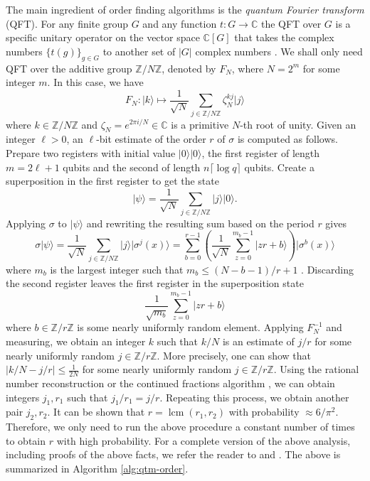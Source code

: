 \documentclass[11pt]{article}
\theoremstyle{plain}
\theoremstyle{definition}
\newcommand{\ldbrac}[1]{\lvert#1\rangle}
\newcommand{\abs}[1]{\left\vert#1\right\vert}
\DeclareMathOperator{\lcm}{lcm} %
\def\C{\ensuremath{\mathbb{C}}}
\def\Z{\ensuremath{\mathbb{Z}}}
\begin{document}
The main ingredient of order finding algorithms is the \textit{quantum Fourier transform} (QFT). 
For any finite group $G$ and any function $t: G \rightarrow \C$ the QFT over $G$ is a specific 
unitary operator on the vector space $\C[G]$ that takes the complex numbers $\{ t(g) \}_{g \in 
G}$ to another set of $\abs{G}$ complex numbers \cite{hallgren2003hidden}. We shall only need QFT 
over the additive group $\Z/N\Z$, denoted by $F_N$, where $N = 2^m$ for some integer $m$. In this 
case, we have 
\[ F_N: \ldbrac{k} \longmapsto \frac{1}{\sqrt{N}}\sum_{j \in \Z/N\Z}\zeta_N^{kj}\ldbrac{j} \]
where $k \in \Z/N\Z$ and $\zeta_N = e^{2\pi i / N} \in \C$ is a primitive $N$-th root of unity. 
Given an integer $\ell > 0$, an $\ell$-bit estimate of the order $r$ of $\sigma$ is computed as 
follows. Prepare two registers with initial value $\ldbrac{0}\ldbrac{0}$, the first register of 
length $m = 2\ell + 1$ qubits and the second of length $n\lceil \log q \rceil$ qubits. Create a 
superposition in the first register to get the state 
\[ \ldbrac{\psi} = \frac{1}{\sqrt{N}} \sum_{j \in \Z/N\Z} \ldbrac{j}\ldbrac{0}. \]
Applying $\sigma$ to $\ldbrac{\psi}$ and rewriting the resulting sum based on the period $r$ gives
\[ \sigma\ldbrac{\psi} = \frac{1}{\sqrt{N}} \sum_{j \in \Z/N\Z} \ldbrac{j}\ldbrac{\sigma^j(x)} = 
\sum_{b = 0}^{r - 1}\left( \frac{1}{\sqrt{N}}\sum_{z = 0}^{m_b - 1}\ldbrac{zr + b} \right) 
\ldbrac{\sigma^b(x)} \]
where $m_b$ is the largest integer such that $m_b \le (N - b - 1) / r + 1$ 
\cite{kaye2007introduction}. Discarding the second register leaves the first register in the 
superposition state
\[ \frac{1}{\sqrt{m_b}} \sum_{z = 0}^{m_b - 1}\ldbrac{zr + b} \]
where $b \in \Z/r\Z$ is some nearly uniformly random element. Applying $F_N^{-1}$ and measuring, we 
obtain an integer $k$ such that $k / N$ is an estimate of $j / r$ for some nearly uniformly random 
$j \in \Z/r\Z$. More precisely, one can show that $\abs{k / N - j / r} \le \frac{1}{2N}$ for some 
nearly uniformly random $j \in \Z/r\Z$. Using the rational number reconstruction 
\cite{pan2002acceleration} or the continued fractions algorithm \cite[\S 5.3]{nielsen2010quantum}, 
we can obtain integers $j_1, r_1$ such that $j_1 / r_1 = j / r$. Repeating this process, we obtain 
another pair $j_2, r_2$. It can be shown that $r = \lcm(r_1, r_2)$ with probability $\approx 6 / 
\pi^2$. Therefore, we only need to run the above procedure a constant number of times to obtain $r$ 
with high probability. For a complete version of the above analysis, including proofs of the above 
facts, we refer the reader to \cite[\S 5.3]{nielsen2010quantum} and \cite[\S 
7.3]{kaye2007introduction}. The above is summarized in Algorithm \ref{alg:qtm-order}.
\end{document}
